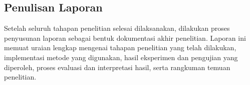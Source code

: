 \subsection{Penulisan Laporan}

Setelah seluruh tahapan penelitian selesai dilaksanakan, dilakukan proses penyusunan laporan sebagai bentuk dokumentasi akhir penelitian. Laporan ini memuat uraian lengkap mengenai tahapan penelitian yang telah dilakukan, implementasi metode yang digunakan, hasil eksperimen dan pengujian yang diperoleh, proses evaluasi dan interpretasi hasil, serta rangkuman temuan penelitian.







